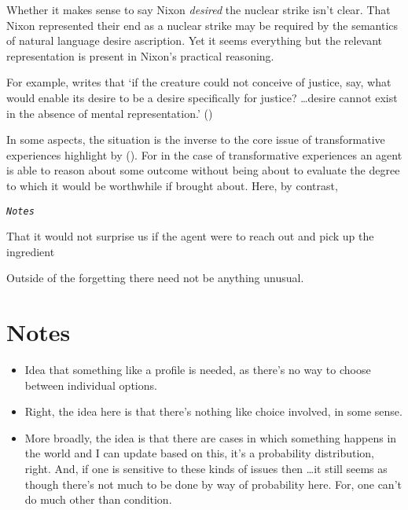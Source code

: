 \documentclass[10pt]{article}
\begin{document}
Whether it makes sense to say Nixon \emph{desired} the nuclear strike isn't clear.
That Nixon represented their end as a nuclear strike may be required by the semantics of natural language desire ascription.
Yet it seems everything but the relevant representation is present in Nixon's practical reasoning.




\newpage








For example, \citeauthor{Schroeder:2004aa} writes that `if the creature could not conceive of justice, say, what would enable its desire to be a desire speciﬁcally for justice?
\dots desire cannot exist in the absence of mental representation.' (\citeauthor[132]{Schroeder:2004aa})







In some aspects, the situation is the inverse to the core issue of transformative experiences highlight by \citeauthor{Paul:2014aa} (\citeyear{Paul:2014aa}).
For in the case of transformative experiences an agent is able to reason about some outcome without being about to evaluate the degree to which it would be worthwhile if brought about.
Here, by contrast, 







\newpage


\begin{center}
  {\color{red} \Huge \texttt{\emph{Notes}}}
\end{center}






That it would not surprise us if the agent were to reach out and pick up the ingredient 





Outside of the forgetting there need not be anything unusual.






\section*{Notes}

\begin{itemize}
\item Idea that something like a profile is needed, as there's no way to choose between individual options.
\item Right, the idea here is that there's nothing like choice involved, in some sense.
\item More broadly, the idea is that there are cases in which something happens in the world and I can update based on this, it's a probability distribution, right.
  And, if one is sensitive to these kinds of issues then \dots it still seems as though there's not much to be done by way of probability here.
  For, one can't do much other than condition.
\end{itemize}
\end{document}
